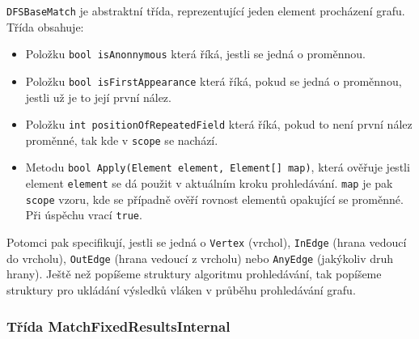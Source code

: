 \texttt{DFSBaseMatch} je abstraktní třída, reprezentující jeden element procházení grafu.
Třída obsahuje:
\begin{itemize}
\item Položku \texttt{bool isAnonnymous} která říká, jestli se jedná o proměnnou.
\item Položku \texttt{bool isFirstAppearance} která říká, pokud se jedná o proměnnou, jestli už je to její první nález.
\item Položku \texttt{int positionOfRepeatedField} která říká, pokud to není první nález proměnné, tak kde v \texttt{scope} se nachází. 
\item Metodu \texttt{bool Apply(Element element, Element[] map)}, která ověřuje jestli element \texttt{element} se dá použit v aktuálním kroku prohledávání.
\texttt{map} je pak \texttt{scope} vzoru, kde se případně ověří rovnost elementů opakující se proměnné. Při úspěchu vrací \texttt{true}.
\end{itemize}
Potomci pak specifikují, jestli se jedná o \texttt{Vertex} (vrchol), \texttt{InEdge} (hrana vedoucí do vrcholu), \texttt{OutEdge} (hrana vedoucí z vrcholu) nebo \texttt{AnyEdge} (jakýkoliv druh hrany).
Ještě než popíšeme struktury algoritmu prohledávání, tak popíšeme struktury pro ukládání výsledků vláken v průběhu prohledávání grafu.

\subsubsection{Třída MatchFixedResultsInternal} \label{impl.match.table}

